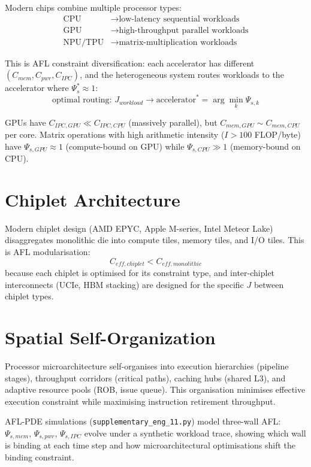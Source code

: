 \documentclass[11pt]{article}
\begin{document}
Modern chips combine multiple processor types:
\begin{align}
\text{CPU} &\to \text{low-latency sequential workloads}\\
\text{GPU} &\to \text{high-throughput parallel workloads}\\
\text{NPU/TPU} &\to \text{matrix-multiplication workloads}
\end{align}

This is AFL constraint diversification: each accelerator has different $(C_{mem}, C_{pwr},
C_{IPC})$, and the heterogeneous system routes workloads to the accelerator where $\Psi_s^* \approx 1$:
\begin{equation}
\text{optimal routing: } J_{workload} \to \text{accelerator}^* = \arg\min_k \Psi_{s,k}
\end{equation}

GPUs have $C_{IPC,GPU} \ll C_{IPC,CPU}$ (massively parallel), but $C_{mem,GPU} \sim C_{mem,CPU}$
per core. Matrix operations with high arithmetic intensity ($I > 100$ FLOP/byte) have
$\Psi_{s,GPU} \approx 1$ (compute-bound on GPU) while $\Psi_{s,CPU} \gg 1$ (memory-bound on CPU).

\section{Chiplet Architecture}

Modern chiplet design (AMD EPYC, Apple M-series, Intel Meteor Lake) disaggregates monolithic
die into compute tiles, memory tiles, and I/O tiles. This is AFL modularisation:
\begin{equation}
C_{eff,chiplet} < C_{eff,monolithic}
\end{equation}
because each chiplet is optimised for its constraint type, and inter-chiplet interconnects
(UCIe, HBM stacking) are designed for the specific $J$ between chiplet types.

\section{Spatial Self-Organization}

Processor microarchitecture self-organises into execution hierarchies (pipeline stages), throughput
corridors (critical paths), caching hubs (shared L3), and adaptive resource pools (ROB, issue
queue). This organisation minimises effective execution constraint while maximising instruction
retirement throughput.

AFL-PDE simulations (\texttt{supplementary\_eng\_11.py}) model three-wall AFL: $\Psi_{s,mem}$,
$\Psi_{s,pwr}$, $\Psi_{s,IPC}$ evolve under a synthetic workload trace, showing which wall is
binding at each time step and how microarchitectural optimisations shift the binding constraint.
\end{document}
